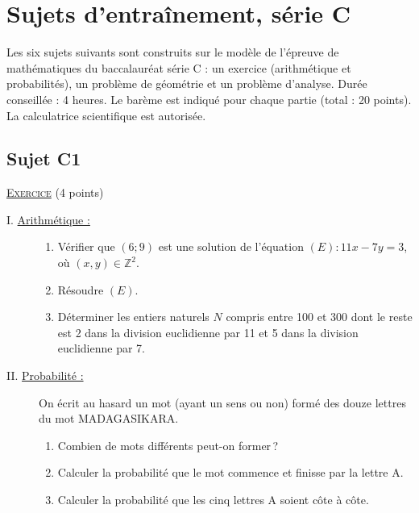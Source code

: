 \chapter{Sujets d'entra\^inement, s\'erie C}
\label{chap:sujets entrainement C}
Les six sujets suivants sont construits sur le mod\`ele de l'\'epreuve de math\'ematiques du baccalaur\'eat s\'erie C :
un exercice (arithm\'etique et probabilit\'es), un probl\`eme de g\'eom\'etrie et un probl\`eme d'analyse.
Dur\'ee conseill\'ee : 4 heures. Le bar\`eme est indiqu\'e pour chaque partie (total : 20 points).
La calculatrice scientifique est autoris\'ee.

\section{Sujet C1}
\noindent \underline{\textsc{Exercice}} (4 points)
\begin{description}
\item[I. \underline{Arithm\'etique :}]
      \begin{enumerate}
      \item V\'erifier que $(6 ; 9)$ est une solution de l'\'equation $(E) : 11x - 7y = 3$, o\`u $(x , y) \in \mathbb{Z}^2$.
      \item R\'esoudre $(E)$.
      \item D\'eterminer les entiers naturels $N$ compris entre 100 et 300 dont le reste est 2 dans la division euclidienne par 11
            et 5 dans la division euclidienne par 7.
      \end{enumerate}
\item[II. \underline{Probabilit\'e :}]
      On \'ecrit au hasard un mot (ayant un sens ou non) form\'e des douze lettres du mot MADAGASIKARA.
      \begin{enumerate}
      \item Combien de mots diff\'erents peut-on former\,?
      \item Calculer la probabilit\'e que le mot commence et finisse par la lettre A.
      \item Calculer la probabilit\'e que les cinq lettres A soient c\^ote \`a c\^ote.
      \end{enumerate}
\end{description}

